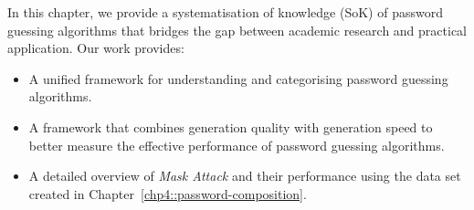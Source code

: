 In this chapter, we provide a systematisation of knowledge (SoK) of password guessing algorithms that bridges the gap between academic research and practical application. Our work provides:
\begin{itemize}
\item A unified framework for understanding and categorising password guessing algorithms.
\item A framework that combines generation quality with generation speed to better measure the effective performance of password guessing algorithms.
\item A detailed overview of \textit{Mask Attack} and their performance using the \pwdninja data set created in Chapter~\ref{chp4::password-composition}.
\end{itemize}